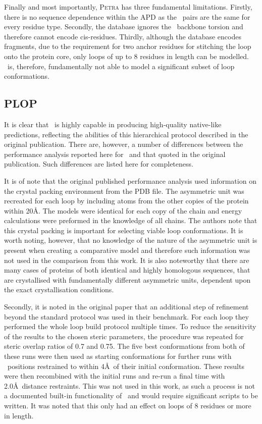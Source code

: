 Finally and most importantly, \textsc{Petra} has three fundamental limitations. Firstly, there is no sequence dependence within the APD as the \phipsi\ pairs are the same for every residue type. Secondly, the database ignores the \Omg\ backbone
torsion and therefore cannot encode  cis-residues. Thirdly, although the database encodes  fragments, due to the requirement for two anchor residues for  stitching the loop onto the protein core, only loops of up to 8 residues in length can be modelled.
\petra\ is, therefore, fundamentally not able to model a significant subset of loop conformations.



\subsection{PLOP}
\label{section:methcomp:plopConclude}

It is clear that \plop\ is highly capable in producing high-quality native-like predictions, reflecting the abilities of this hierarchical protocol described in the original publication. There are, however, a number of differences between the performance analysis reported here for \plop\ and that quoted in the original publication\cite{METHOD:Plop}. Such differences are listed here for completeness.

It is of note that the original published performance analysis used information on the crystal packing environment from the PDB file. The asymmetric unit was recreated for each loop by including atoms from the other copies of the protein within 20\AA. The models were identical for each copy of the chain and energy calculations were preformed in the knowledge of all chains. The authors note that this crystal packing is important for selecting viable loop conformations. It is worth noting, however, that no knowledge of the nature of the asymmetric unit is present when creating a comparative model and therefore such information was not used in the comparison from this work. It is also noteworthy that there are many cases of proteins of both identical and highly homologous sequences, that are crystallised with fundamentally different asymmetric units, dependent upon the exact crystallisation conditions.

Secondly, it is noted in the original paper\cite{METHOD:Plop} that an additional step of refinement beyond the standard protocol was used in their benchmark. For each loop they performed the whole loop build protocol multiple times. To reduce the sensitivity of the results to the chosen steric parameters, the procedure was repeated for steric overlap ratios of 0.7 and 0.75. The five best conformations from both of these runs were then used as starting conformations for further runs with \ca\ positions restrained to within 4\AA\ of their initial conformation. These results were then recombined with the initial runs and re-run a final time with 2.0\AA\ distance restraints. This was not used in this work, as such a process is not a documented built-in functionality of \plop\ and would require significant scripts to be written. It was noted that this only had an effect on loops of 8 residues or more in length.

